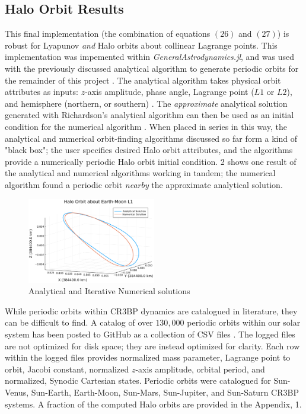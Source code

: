 \documentclass[conf]{new-aiaa}
\begin{document}
\begin{multicols}{2}
\subsection{Halo Orbit Results}
This final implementation (the combination of equations $(26)$ and $(27)$) 
is robust for Lyapunov \textit{and} Halo orbits about collinear Lagrange points. 
This implementation was impemented within \textit{GeneralAstrodynamics.jl}, and 
was used with the previously discussed analytical algorithm to generate 
periodic orbits for the remainder of this project \cite{carpinelli2020astro}.
The analytical algorithm takes physical orbit attributes as inputs: $z$-axis 
amplitude, phase angle, Lagrange point ($L1$ or $L2$), and hemisphere 
(northern, or southern) \cite{rund2018interplanetary}. 
The \textit{approximate} analytical solution generated 
with Richardson's analytical algorithm can then be used as an initial 
condition for the numerical algorithm \cite{rund2018interplanetary} 
\cite{richardson1980analytical}. When placed in series in this way, the 
analytical and numerical orbit-finding algorithms discussed so far form a 
kind of "black box"; the user specifies desired Halo orbit attributes, 
and the algorithms provide a numerically periodic Halo orbit initial condition.
\figurename{2} shows one result of the analytical and numerical algorithms 
working in tandem; the numerical algorithm found a periodic orbit \textit{nearby}
the approximate analytical solution. 

\begin{figure}[H]
    \hskip -0.3cm
    \includegraphics[width=0.5\textwidth]{analytical_numerical_halo.png}
    \caption{Analytical and Iterative Numerical solutions}
\end{figure}

While periodic orbits within CR3BP dynamics are catalogued in literature,
they can be difficult to find. A catalog of over $130,000$ periodic orbits 
within our solar system has been posted to GitHub as a collection of CSV files 
\cite{carpinelli2020halos}. The logged files are not optimized for disk 
space; they are instead optimized for clarity. Each row within the logged files 
provides normalized mass parameter, Lagrange point to orbit, Jacobi constant,
normalized $z$-axis amplitude, orbital period, and  
normalized, Synodic Cartesian states. Periodic orbits were catalogued for 
Sun-Venus, Sun-Earth, Earth-Moon, Sun-Mars, Sun-Jupiter, and Sun-Saturn CR3BP 
systems. A fraction of the computed Halo orbits are provided in the Appendix, 
\tablename{1}.


\end{multicols}
\end{document}
